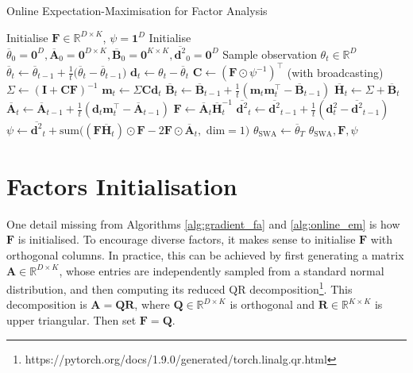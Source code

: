 \documentclass[msc,deptreport.inf]{infthesis} %
\newcommand{\matr}[1]{\mathbf{#1}}
\newcommand{\R}{\mathbb R}
\begin{document}
\begin{algorithm}[!htbp] 
	\caption{Online Expectation-Maximisation for Factor Analysis}
	\label{alg:online_em}
	\begin{algorithmic}[1]
		\State Initialise $\matr{F} \in \R^{D \times K}$, $\psi = \matr{1}^D$
		\State Initialise $\overline{\theta}_0 = \matr{0}^D, \overline{\matr{A}}_0 = \matr{0}^{D \times K}, 
			\overline{\matr{B}}_0 = \matr{0}^{K \times K}, \overline{\matr{d}^2}_0 = \matr{0}^D$
			\State Sample observation $\theta_t \in \R^D$
			\State
				$\overline{\theta}_t \leftarrow  \overline{\theta}_{t-1} + \frac{1}{t}\big(\overline{\theta}_t - \overline{\theta}_{t-1}\big)$
			\State $\matr{d}_t \leftarrow \theta_t - \overline{\theta}_t$
			\State $\matr{C} \leftarrow (\matr{F} \odot \psi^{-1})^\intercal$ (with broadcasting)
			\State $\Sigma \leftarrow (\matr{I} + \matr{C} \matr{F})^{-1}$ 
			\State $\matr{m}_t \leftarrow \Sigma \matr{C} \matr{d}_t$ 
			\State $\overline{\matr{B}}_t \leftarrow \overline{\matr{B}}_{t-1} + \frac{1}{t} (\matr{m}_t \matr{m}_t^\intercal - \overline{\matr{B}}_{t-1})$
			\State $\overline{\matr{H}}_t \leftarrow \Sigma + \overline{\matr{B}}_t$
			\State $\overline{\matr{A}}_t \leftarrow \overline{\matr{A}}_{t-1} + \frac{1}{t} (\matr{d}_t \matr{m}_t^\intercal - \overline{\matr{A}}_{t-1})$
			\State $\matr{F} \leftarrow \overline{\matr{A}}_t \overline{\matr{H}}_t^{-1}$
			\State $\overline{\matr{d}^2}_t \leftarrow \overline{\matr{d}^2}_{t-1} + \frac{1}{t} (\matr{d}_t^2 - \overline{\matr{d}^2}_{t-1})$
			\State $\psi \leftarrow 
				\overline{\matr{d}^2}_t
	+ \text{sum} \big((\matr{F} \overline{\matr{H}}_t) \odot \matr{F} -2\matr{F} \odot \overline{\matr{A}}_t , \text{ dim} = 1\big)$
		\EndFor
		\State $\theta_{\text{SWA}} \leftarrow \overline{\theta}_T$
		\State \Return $\theta_{\text{SWA}}, \matr{F}, \psi$
	\end{algorithmic}
\end{algorithm}


\section{Factors Initialisation}\label{sec:F_init}

One detail missing from Algorithms \ref{alg:gradient_fa} and \ref{alg:online_em} is how $\matr{F}$ is initialised. To encourage diverse factors, it makes sense to initialise $\matr{F}$ with orthogonal columns. In practice, this can be achieved by first generating a matrix $\matr{A}  \in \R^{D \times K}$, whose entries are independently sampled from a standard normal distribution, and then computing its reduced QR decomposition\footnote{https://pytorch.org/docs/1.9.0/generated/torch.linalg.qr.html}. This decomposition is $\matr{A} = \matr{Q}\matr{R}$, where $\matr{Q} \in \R^{D \times K}$ is orthogonal and $\matr{R} \in \R^{K \times K}$ is upper triangular. Then set $\matr{F} = \matr{Q}$. 
\end{document}
